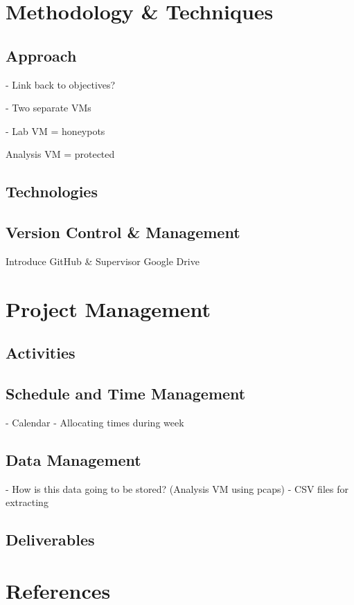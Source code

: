 \documentclass[a4paper,12pt,oneside]{book}			%
\begin{document}
\chapter{Methodology \&{} Techniques}\label{ch:methods}
\section{Approach}\label{sec:approach}
- Link back to objectives?

- Two separate VMs

- Lab VM = honeypots

Analysis VM = protected

\section{Technologies}\label{sec:technologies}
\section{Version Control \&{} Management}\label{sec:versionControl}
Introduce GitHub \&{} Supervisor Google Drive


\chapter{Project Management}\label{ch:project management}
\section{Activities}\label{sec:activities}
\section{Schedule and Time Management}\label{sec:time management}
- Calendar
- Allocating times during week
\section{Data Management}\label{sec:data management}
- How is this data going to be stored? (Analysis VM using pcaps)
- CSV files for extracting
\section{Deliverables}\label{sec: deliverables}



\chapter{References}

\printbibliography
\end{document}
